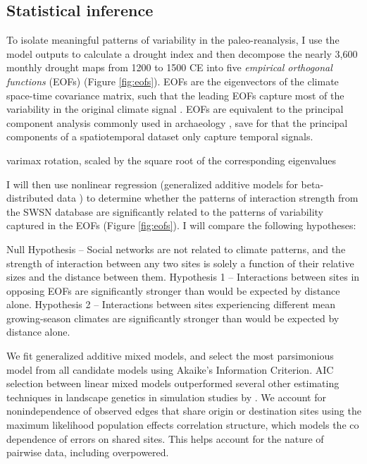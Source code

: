 \documentclass[fleqn,10pt]{wlscirep}
\begin{document}
\subsection*{Statistical inference}

To isolate meaningful patterns of variability in the paleo-reanalysis, I use the model outputs to calculate a drought index and then decompose the nearly 3,600 monthly drought maps from 1200 to 1500 CE into five \textit{empirical orthogonal functions} (EOFs) (Figure \ref{fig:eofs}). EOFs are the eigenvectors of the climate space-time covariance matrix, such that the leading EOFs capture most of the variability in the original climate signal \cite{Lorenz1956EmpiricalPrediction}. EOFs are equivalent to the principal component analysis commonly used in archaeology \cite[e.g.]{Dean1996DemographyStress}, save for that the principal components of a spatiotemporal dataset only capture temporal signals.

varimax rotation, scaled by the square root of the corresponding eigenvalues

I will then use nonlinear regression (generalized additive models for beta-distributed data \cite{Wood2006a}) to determine whether the patterns of interaction strength from the SWSN database are significantly related to the patterns of variability captured in the EOFs (Figure \ref{fig:eofs}). I will compare the following hypotheses:

Null Hypothesis -- Social networks are not related to climate patterns, and the strength of interaction between any two sites is solely a function of their relative sizes and the distance between them.
Hypothesis 1 -- Interactions between sites in opposing EOFs are significantly stronger than would be expected by distance alone.
Hypothesis 2 -- Interactions between sites experiencing different mean growing-season climates are significantly stronger than would be expected by distance alone.

We fit generalized additive mixed models, and select the most parsimonious model from all candidate models using Akaike's Information Criterion. AIC selection between linear mixed models outperformed several other estimating techniques in landscape genetics in simulation studies by \cite{Shirk et al 2018}. We account for nonindependence of observed edges that share origin or destination sites using the maximum likelihood population effects correlation structure, which models the co dependence of errors on shared sites. This helps account for the nature of pairwise data, including overpowered.
\end{document}
